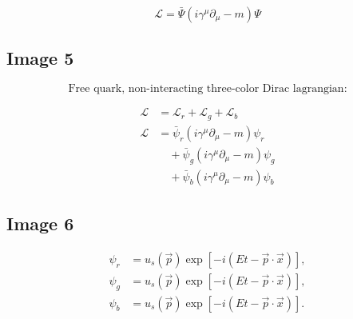 \documentclass[11pt]{article}
\begin{document}
        \[
            \mathcal{L} = \bar{\Psi}\left(i\gamma^\mu \partial_\mu - m\right)\Psi
        \]
    
    \subsection*{Image 5}
        \[
            \text{Free quark, non-interacting three-color Dirac lagrangian:}
        \]
        
        \begin{align*}
            \mathcal{L} &= \mathcal{L}_r + \mathcal{L}_g + \mathcal{L}_b \\
            \mathcal{L}
            &= \bar{\psi}_r \left(i\gamma^\mu \partial_\mu - m\right)\psi_r \\
            &\quad + \bar{\psi}_g \left(i\gamma^\mu \partial_\mu - m\right)\psi_g \\
            &\quad + \bar{\psi}_b \left(i\gamma^\mu \partial_\mu - m\right)\psi_b
        \end{align*}
    
    \subsection*{Image 6}
        \begin{align*}
            \psi_r &= u_s(\vec{p}) \exp\!\left[-i\left(Et - \vec{p}\cdot\vec{x}\right)\right], \\
            \psi_g &= u_s(\vec{p}) \exp\!\left[-i\left(Et - \vec{p}\cdot\vec{x}\right)\right], \\
            \psi_b &= u_s(\vec{p}) \exp\!\left[-i\left(Et - \vec{p}\cdot\vec{x}\right)\right].
        \end{align*}
    
\end{document}
